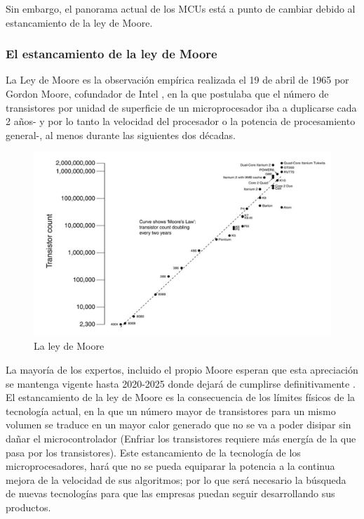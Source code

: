 Sin embargo, el panorama actual de los MCUs está a punto de cambiar debido al estancamiento de la ley de Moore. \newline

\subsubsection{El estancamiento de la ley de Moore}

La Ley de Moore es la observación empírica realizada el 19 de abril de 1965 por Gordon Moore, cofundador de Intel , en la que postulaba que el número de transistores por unidad de superficie de un microprocesador iba a duplicarse cada 2 años- y por lo tanto la velocidad del procesador o la potencia de procesamiento general-, al menos durante las siguientes dos décadas.\newline

\begin{figure}[H]
	\center
	\includegraphics[scale=0.6]{imagenes/Herramientas/leymoore.png}
	\caption{La ley de Moore}
	\label{fig:La ley de Moore}
\end{figure}

La mayoría de los expertos, incluido el propio Moore esperan que esta apreciación se mantenga vigente hasta 2020-2025 donde dejará de cumplirse definitivamente . El estancamiento de la ley de Moore es la consecuencia de los límites físicos de la tecnología actual, en la que un número mayor de transistores para un mismo volumen se traduce en un mayor calor generado que no se va a poder disipar sin dañar el microcontrolador (Enfriar los transistores requiere más energía de la que pasa por los transistores).
 Este estancamiento de la tecnología de los microprocesadores, hará que no se pueda equiparar la potencia a la continua mejora de la velocidad de sus algoritmos; por lo que será necesario la búsqueda de nuevas tecnologías para que las empresas puedan seguir desarrollando sus productos.\newline

